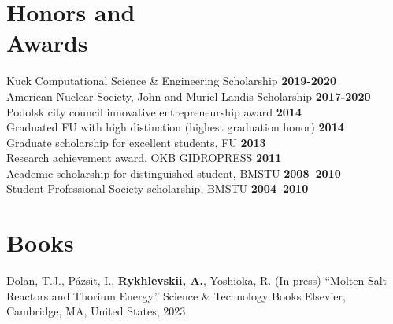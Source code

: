 \documentclass[margin,line]{resume}
\begin{document}
\begin{resume}
	\section{\mysidestyle Honors and\\Awards}
	Kuck Computational Science \& Engineering Scholarship\hfill 
	\textbf{2019-2020}\vspace{.5mm}\\%
	American Nuclear Society, John and Muriel Landis Scholarship\hfill 
	\textbf{2017-2020}\vspace{.5mm}\\%
	Podolsk city council innovative entrepreneurship award\hfill 
	\textbf{2014}\vspace{.5mm}\\%
	Graduated FU with high distinction (highest graduation 
	honor)                \hfill \textbf{2014}\vspace{.5mm}\\%
	Graduate scholarship for excellent students, 
	FU                       	\hfill \textbf{2013}\vspace{.5mm}\\%
	Research achievement award, OKB 
	GIDROPRESS                                   
	\hfill\textbf{2011}\vspace{.5mm}\\%
	Academic scholarship for distinguished student, 
	BMSTU		                 \hfill\textbf{2008--2010}\vspace{.5mm}\\%
	Student Professional Society scholarship, 
	BMSTU                                \hfill\textbf{2004--2010}%
	\section{\mysidestyle Books}
	\begin{bibenum}
		\item Dolan, T.J., Pázsit, I., \textbf{Rykhlevskii, A.}, Yoshioka, R. (In press) 
		``Molten Salt Reactors and Thorium Energy.'' Science \& Technology Books Elsevier, Cambridge, MA,    			United States, 2023.
	\end{bibenum}

\end{resume}
\end{document}

